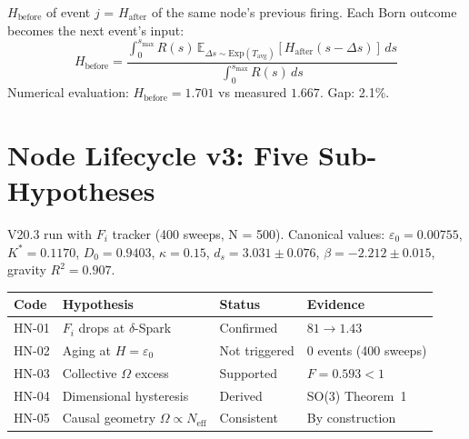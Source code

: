 \documentclass[12pt, a4paper]{article}
\begin{document}
\begin{derivedbox}[title={$H_{\mathrm{before}}$ from Rate-Weighted Causal Memory (2.1\%)}]
$H_{\mathrm{before}}$ of event $j$ = $H_{\mathrm{after}}$ of the same node's previous firing.
Each Born outcome becomes the next event's input:
\[
H_{\mathrm{before}} = \frac{\int_0^{s_{\max}} R(s)\,\mathbb{E}_{\Delta s \sim \mathrm{Exp}(T_{\mathrm{avg}})}[H_{\mathrm{after}}(s-\Delta s)]\,ds}{\int_0^{s_{\max}} R(s)\,ds}
\]
Numerical evaluation: $H_{\mathrm{before}} = 1.701$ vs measured $1.667$. Gap: 2.1\%.
\end{derivedbox}

\section{Node Lifecycle v3: Five Sub-Hypotheses}

V20.3 run with $F_i$ tracker (400 sweeps, N = 500). Canonical values:
$\varepsilon_0 = 0.00755$, $K^* = 0.1170$, $D_0 = 0.9403$, $\kappa = 0.15$,
$d_s = 3.031 \pm 0.076$, $\beta = -2.212 \pm 0.015$, gravity $R^2 = 0.907$.

\begin{center}
\renewcommand{\arraystretch}{1.35}
\begin{tabular}{p{1.5cm} p{5cm} p{2.5cm} p{4cm}}
\toprule
\textbf{Code} & \textbf{Hypothesis} & \textbf{Status} & \textbf{Evidence} \\
\midrule
HN-01 & $F_i$ drops at $\delta$-Spark & Confirmed & $81 \to 1.43$ \\
HN-02 & Aging at $H = \varepsilon_0$ & Not triggered & 0 events (400 sweeps) \\
HN-03 & Collective $\Omega$ excess & Supported & $F = 0.593 < 1$ \\
HN-04 & Dimensional hysteresis & Derived & SO(3) Theorem~1 \\
HN-05 & Causal geometry $\Omega \propto N_{\mathrm{eff}}$ & Consistent & By construction \\
\bottomrule
\end{tabular}
\end{center}
\end{document}
